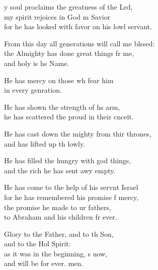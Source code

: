 \settowidth{\versewidth}{From this day all generations will call me blessed: +}
\begin{psalmverse}%
  \begin{patverse}
y soul proclaims the greatness of the Lrd,\Flex\\
my spirit rejoices in God m Savior\Med\\
for he has looked with favor on his lowl servant.

From this day all generations will call me blssed:\Flex\\
the Almighty has done great things fr me,\Med\\
and holy is h\pointup{\i}s Name.

He has mercy on those wh fear him\Med\\
in every genration.

He has shown the strength of h\pointup{\i}s arm,\Med\\
he has scattered the proud in their cnceit.

He has cast down the mighty from thir thrones,\Med\\
and has lifted up th lowly.

He has filled the hungry with god things,\Med\\
and the rich he has sent awy empty.

He has come to the help of his servnt Israel\Med\\
for he has remembered his promise f mercy,\\
the promise he made to ur fathers,\Med\\
to Abraham and his children fr ever.

Glory to the Father, and to th Son,\Med\\
and to the Hol Spirit:\\
as it was in the beginning, \pointup{\i}s now,\Med\\
and will be for ever. men.
  \end{patverse}
\end{psalmverse}
